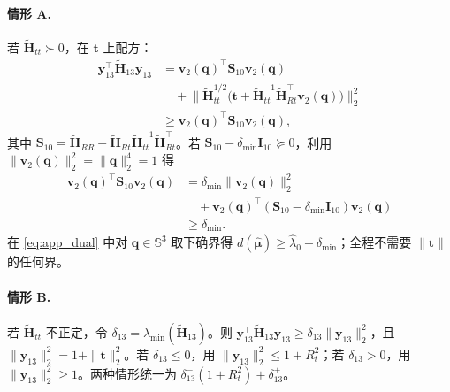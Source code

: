 \paragraph{情形 A.} 若 $\tilde{\mathbf H}_{tt}\succ0$，在 $\mathbf t$ 上配方：
\begin{equation}
\begin{aligned}
\mathbf y_{13}^\top\tilde{\mathbf H}_{13}\mathbf y_{13}
&=\mathbf v_2(\mathbf q)^\top\mathbf S_{10}\mathbf v_2(\mathbf q)\\
&\quad+\big\|\tilde{\mathbf H}_{tt}^{1/2}\big(\mathbf t+\tilde{\mathbf H}_{tt}^{-1}\tilde{\mathbf H}_{Rt}^\top\mathbf v_2(\mathbf q)\big)\big\|_2^2\\
&\ge\mathbf v_2(\mathbf q)^\top\mathbf S_{10}\mathbf v_2(\mathbf q),
\end{aligned}
\end{equation}
其中 $\mathbf S_{10}=\tilde{\mathbf H}_{RR}-\tilde{\mathbf H}_{Rt}\tilde{\mathbf H}_{tt}^{-1}\tilde{\mathbf H}_{Rt}^\top$。若 $\mathbf S_{10}-\delta_{\min}\mathbf I_{10}\succeq0$，利用 $\|\mathbf v_2(\mathbf q)\|_2^2=\|\mathbf q\|_2^4=1$ 得
\begin{equation}
\begin{aligned}
\mathbf v_2(\mathbf q)^\top\mathbf S_{10}\mathbf v_2(\mathbf q)
&=\delta_{\min}\|\mathbf v_2(\mathbf q)\|_2^2\\
&\quad+\mathbf v_2(\mathbf q)^\top(\mathbf S_{10}-\delta_{\min}\mathbf I_{10})\mathbf v_2(\mathbf q)\\
&\ge\delta_{\min}.
\end{aligned}
\end{equation}
在 \eqref{eq:app_dual} 中对 $\mathbf q\in\mathbb S^3$ 取下确界得 $d(\hat{\boldsymbol\mu})\ge\hat\lambda_0+\delta_{\min}$；全程不需要 $\|\mathbf t\|$ 的任何界。

\paragraph{情形 B.} 若 $\tilde{\mathbf H}_{tt}$ 不正定，令 $\delta_{13}=\lambda_{\min}(\tilde{\mathbf H}_{13})$。则 $\mathbf y_{13}^\top\tilde{\mathbf H}_{13}\mathbf y_{13}\ge\delta_{13}\|\mathbf y_{13}\|_2^2$，且 $\|\mathbf y_{13}\|_2^2=1+\|\mathbf t\|_2^2$。若 $\delta_{13}\le0$，用 $\|\mathbf y_{13}\|_2^2\le1+R_t^2$；若 $\delta_{13}>0$，用 $\|\mathbf y_{13}\|_2^2\ge1$。两种情形统一为 $\delta_{13}^-(1+R_t^2)+\delta_{13}^+$。

